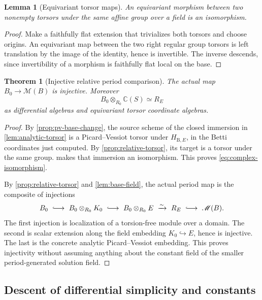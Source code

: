 \documentclass[11pt]{article}
\numberwithin{equation}{section}
\newtheorem{theorem}{Theorem}[section]
\newtheorem{lemma}[lemma]{Lemma}
\theoremstyle{definition}
\theoremstyle{remark}
\newcommand{\C}{\mathbb C}
\newcommand{\B}{\mathrm B}
\begin{document}
\begin{lemma}[Equivariant torsor maps]\label{lem:torsor-iso}
An equivariant morphism between two nonempty torsors under the same affine
group over a field is an isomorphism.
\end{lemma}
\begin{proof}
Make a faithfully flat extension that trivializes both torsors and choose
origins. An equivariant map between the two right regular group torsors
is left translation by the image of the identity, hence is invertible.
The inverse descends, since invertibility of a morphism is faithfully
flat local on the base.
\end{proof}

\begin{theorem}[Injective relative period comparison]\label{thm:period-injective}
The actual map $B_0\to\mathscr M(B)$ is injective. Moreover
\begin{equation}\label{eq:complex-isomorphism}
 B_0\otimes_{R_0}\C(S)\simeq R_E
\end{equation}
as differential algebras and equivariant torsor coordinate algebras.
\end{theorem}
\begin{proof}
By \cref{prop:pv-base-change}, the source scheme of the closed immersion
in \cref{lem:analytic-torsor} is a Picard--Vessiot torsor under
$H_{\B,E}$, in the Betti coordinates just computed. By
\cref{prop:relative-torsor}, its target is a torsor under the same group.
 makes that immersion an isomorphism. This proves
\eqref{eq:complex-isomorphism}.

By \cref{prop:relative-torsor} and \cref{lem:base-field}, the actual
period map is the composite of injections
\[
 B_0\ \lhook\joinrel\longrightarrow\ B_0\otimes_{R_0}K_0
 \ \lhook\joinrel\longrightarrow\ B_0\otimes_{R_0}E
 \ \xrightarrow{\sim}\ R_E
 \ \lhook\joinrel\longrightarrow\ \mathscr M(B).
\]
The first injection is localization of a torsion-free module over a
domain. The second is scalar extension along the field embedding
$K_0\hookrightarrow E$, hence is injective. The last is the concrete
analytic Picard--Vessiot embedding. This proves injectivity without
assuming anything about the constant field of the smaller period-generated
solution field.
\end{proof}

\subsection{Descent of differential simplicity and constants}
\end{document}

